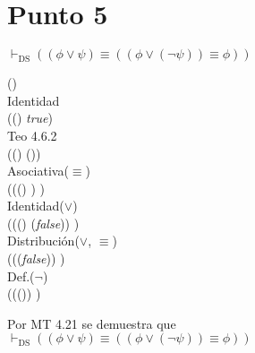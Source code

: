 \documentclass{article}
\begin{document}
\section{Punto 5}
\begin{logicenv}{$\vdash_{\text{DS}} ((\phi \lor \psi) \equiv ((\phi \lor (\neg \psi)) \equiv \phi))$}
    \begin{derivation}
        (\phi \lor \psi)\\
        Identidad\\
        ((\phi \lor \psi) \equiv \textrm{\textit{true}})\\
        Teo 4.6.2\\
        ((\phi \lor \psi) \equiv (\phi \equiv \phi))\\
        Asociativa($\equiv$)\\
        (((\phi \lor \psi) \equiv \phi) \equiv \phi)\\
        Identidad($\lor$)\\
        (((\phi \lor \psi) \equiv (\phi \lor \textrm{\textit{false}})) \equiv \phi)\\
        Distribución($\lor$, $\equiv$)\\
        ((\phi \lor (\psi \equiv \textrm{\textit{false}})) \equiv \phi)\\
        Def.($\neg$)\\
        ((\phi \lor (\neg \psi)) \equiv \phi)
    \end{derivation}
    Por MT 4.21 se demuestra que\\
    $\vdash_{\text{DS}} ((\phi \lor \psi) \equiv ((\phi \lor (\neg \psi)) \equiv \phi))$
\end{logicenv}
\end{document}
